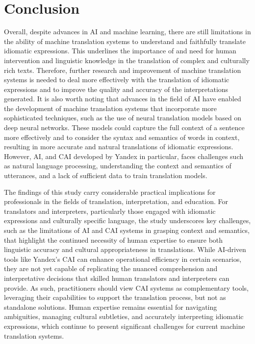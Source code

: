 \section{Conclusion}\label{sec-conclusion}

Overall, despite advances in AI and machine learning, there are still
limitations in the ability of machine translation systems to understand
and faithfully translate idiomatic expressions. This underlines the
importance of and need for human intervention and linguistic knowledge
in the translation of complex and culturally rich texts. Therefore,
further research and improvement of machine translation systems is
needed to deal more effectively with the translation of idiomatic
expressions and to improve the quality and accuracy of the
interpretations generated. It is also worth noting that advances in the
field of AI have enabled the development of machine translation systems
that incorporate more sophisticated techniques, such as the use of
neural translation models based on deep neural networks. These models
could capture the full context of a sentence more effectively and to
consider the syntax and semantics of words in context, resulting in more
accurate and natural translations of idiomatic expressions. However, AI,
and CAI developed by Yandex in particular, faces challenges such as
natural language processing, understanding the context and semantics of
utterances, and a lack of sufficient data to train translation models.

The findings of this study carry considerable practical implications for
professionals in the fields of translation, interpretation, and
education. For translators and interpreters, particularly those engaged
with idiomatic expressions and culturally specific language, the study
underscores key challenges, such as the limitations of AI and CAI
systems in grasping context and semantics, that highlight the continued
necessity of human expertise to ensure both linguistic accuracy and
cultural appropriateness in translations. While AI-driven tools like
Yandex's CAI can enhance operational efficiency in certain scenarios,
they are not yet capable of replicating the nuanced comprehension and
interpretative decisions that skilled human translators and interpreters
can provide. As such, practitioners should view CAI systems as
complementary tools, leveraging their capabilities to support the
translation process, but not as standalone solutions. Human expertise
remains essential for navigating ambiguities, managing cultural
subtleties, and accurately interpreting idiomatic expressions, which
continue to present significant challenges for current machine
translation systems.

